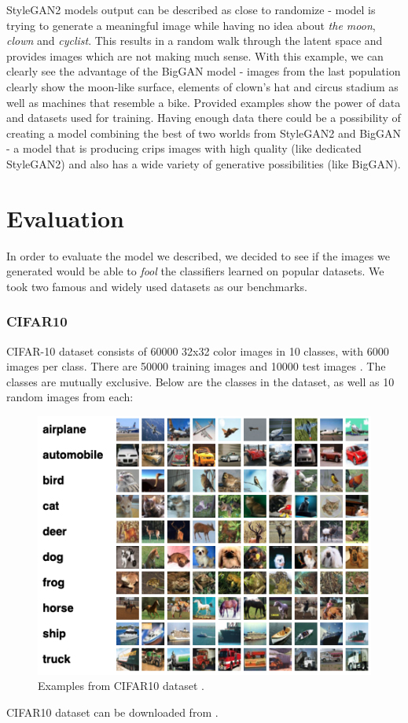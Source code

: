 \documentclass[12pt,a4paper,openany]{book}
\begin{document}
\noindent StyleGAN2 models output can be described as close to randomize - model is trying to generate a meaningful image while having no idea about \textit{the moon}, \textit{clown} and \textit{cyclist}. This results in a random walk through the latent space and provides images which are not making much sense. With this example, we can clearly see the advantage of the BigGAN model - images from the last population clearly show the moon-like surface, elements of clown's hat and circus stadium as well as machines that resemble a bike.
\noindent Provided examples show the power of data and datasets used for training. Having enough data there could be a possibility of creating a model combining the best of two worlds from StyleGAN2 and BigGAN - a model that is producing crips images with high quality (like dedicated StyleGAN2) and also has a wide variety of generative possibilities (like BigGAN).

\newpage

\chapter{Evaluation}

\noindent In order to evaluate the model we described, we decided to see if the images we generated would be able to \textit{fool} the classifiers learned on popular datasets.
We took two famous and widely used datasets as our benchmarks.
\subsection*{CIFAR10}
\noindent CIFAR-10 dataset consists of 60000 32x32 color images in 10 classes, with 6000 images per class. There are 50000 training images and 10000 test images \cite{cifar10_data}. The classes are mutually exclusive. Below are the classes in the dataset, as well as 10 random images from each:
\begin{figure}[H]
    \centering
    \includegraphics[scale=0.6]{figs/cifar10_dataset.png}
    \caption{Examples from CIFAR10 dataset \cite{cifar10_data}.}
\end{figure}
\noindent CIFAR10 dataset can be downloaded from \cite{cifar10_data}.
\end{document}
